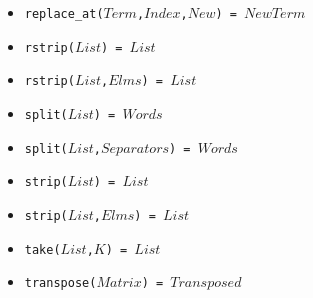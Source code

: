 \documentclass[10pt]{article}
\newcommand{\ignore}[1]{}
\begin{document}
\begin{multicols}{2}
\begin{scriptsize}
\begin{itemize}
    \item \texttt{replace\_at($Term$,$Index$,$New$) = $NewTerm$}
    \item \texttt{rstrip($List$) = $List$ } 
    \item \texttt{rstrip($List$,$Elms$) = $List$ }
    \item \texttt{split($List$) = $Words$ } 
    \item \texttt{split($List$,$Separators$) = $Words$ }
    \item \texttt{strip($List$) = $List$ }
    \item \texttt{strip($List$,$Elms$) = $List$ } 
    \item \texttt{take($List$,$K$) = $List$} 
    \item \texttt{transpose($Matrix$) = $Transposed$}
\end{itemize}
\end{scriptsize}


\ignore{
}
\end{multicols}
\end{document}
